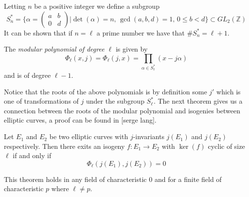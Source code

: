 Letting $n$ be a positive integer we define a subgroup
$$ S_n^* = \{ \alpha = \begin{pmatrix} a & b \\ 0 & d \end{pmatrix} | \det(\alpha)=n,\, \gcd(a,b,d)=1,\, 0 \leq b < d \} \subset GL_2(\mathbb{Z}) $$
It can be shown that if $n = \ell$ a prime number we have that $\#S_n^* = \ell + 1$.

\begin{mydef}
 The \emph{modular polynomial of degree $\ell$} is given by
$$\Phi_\ell(x,j) = \Phi_\ell(j,x) = \prod_{\alpha \in S_\ell^*}(x - j \alpha) $$
and is of degree $\ell-1$.
\end{mydef}
Notice that the roots of the above polynomials is by definition some $j'$ which is one of transformations
of $j$ under the subgroup $S_\ell^*$. The next theorem gives us a connection between the roots of the
modular polynomial and isogenies between elliptic curves, a proof can be found in [serge lang].

\begin{thm}
 Let $E_1$ and $E_2$ be two elliptic curves with $j$-invariants $j(E_1)$ and $j(E_2)$ respectively.
Then there exits an isogeny $f: E_1 \rightarrow E_2$ with $\ker(f)$ cyclic of size $\ell$ if and only if
$$\Phi_\ell(j(E_1), j(E_2)) = 0 $$
\end{thm}

This theorem holds in any field of characteristic $0$ and for a finite field of characteristic $p$ where
$\ell \neq p$.
